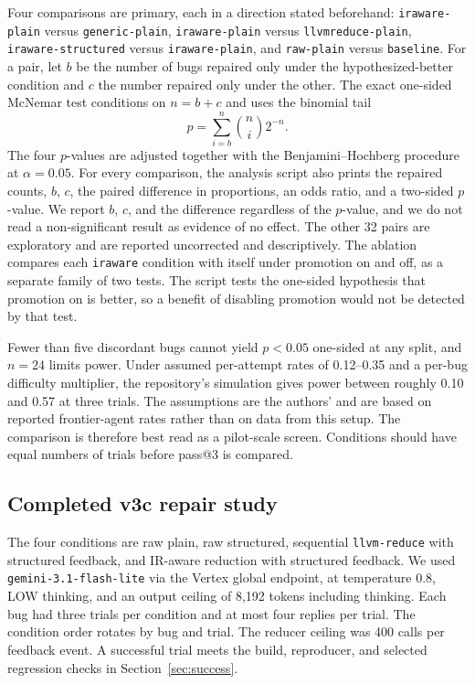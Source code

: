 \documentclass[conference]{IEEEtran}
\newcommand{\cn}[1]{\texttt{#1}}   %
\begin{document}
Four comparisons are primary, each in a direction stated beforehand: \cn{iraware-plain} versus \cn{generic-plain}, \cn{iraware-plain} versus \cn{llvmreduce-plain}, \cn{iraware-structured} versus \cn{iraware-plain}, and \cn{raw-plain} versus \cn{baseline}. For a pair, let $b$ be the number of bugs repaired only under the hypothesized-better condition and $c$ the number repaired only under the other. The exact one-sided McNemar test conditions on $n=b+c$ and uses the binomial tail
\begin{equation}
p=\sum_{i=b}^{n}\binom{n}{i}2^{-n}.
\end{equation}
The four $p$-values are adjusted together with the Benjamini--Hochberg procedure~\cite{benjamini1995fdr} at $\alpha=0.05$. For every comparison, the analysis script also prints the repaired counts, $b$, $c$, the paired difference in proportions, an odds ratio, and a two-sided $p$-value. We report $b$, $c$, and the difference regardless of the $p$-value, and we do not read a non-significant result as evidence of no effect. The other 32 pairs are exploratory and are reported uncorrected and descriptively. The ablation compares each \cn{iraware} condition with itself under promotion on and off, as a separate family of two tests. The script tests the one-sided hypothesis that promotion on is better, so a benefit of disabling promotion would not be detected by that test.

Fewer than five discordant bugs cannot yield $p<0.05$ one-sided at any split, and $n=24$ limits power. Under assumed per-attempt rates of 0.12--0.35 and a per-bug difficulty multiplier, the repository's simulation gives power between roughly 0.10 and 0.57 at three trials. The assumptions are the authors' and are based on reported frontier-agent rates rather than on data from this setup. The comparison is therefore best read as a pilot-scale screen. Conditions should have equal numbers of trials before pass@3 is compared.

\subsection{Completed v3c repair study}
\label{sec:v3}

The four conditions are raw plain, raw structured, sequential \texttt{llvm-reduce} with structured feedback, and IR-aware reduction with structured feedback. We used \texttt{gemini-3.1-flash-lite} via the Vertex global endpoint, at temperature 0.8, LOW thinking, and an output ceiling of 8,192 tokens including thinking. Each bug had three trials per condition and at most four replies per trial. The condition order rotates by bug and trial. The reducer ceiling was 400 calls per feedback event. A successful trial meets the build, reproducer, and selected regression checks in Section~\ref{sec:success}.
\end{document}
